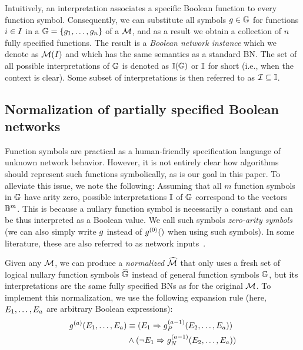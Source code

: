 Intuitively, an interpretation associates a specific Boolean function to every function symbol. Consequently, we can substitute all symbols $g \in \mathbb{G}$ for functions $i \in I$ in a $\mathbb{G} = \{g_1, \ldots, g_n\}$ of a $\mathcal{M}$, and as a result we obtain a collection of $n$ fully specified functions. The result is a \emph{Boolean network instance} which we denote as $\mathcal{M}(I)$ and which has the same semantics as a standard BN. The set of all possible interpretations of $\mathbb{G}$ is denoted as $\mathbb{I}(\mathbb{G})$ or $\mathbb{I}$ for short (i.e., when the context is clear). Some subset of interpretations is then referred to as $\mathcal{I} \subseteq \mathbb{I}$. 

\subsection[Normalization of PSBN]{Normalization of partially specified Boolean networks}

Function symbols are practical as a human-friendly specification language of unknown network behavior. However, it is not entirely clear how algorithms should represent such functions symbolically, as is our goal in this paper. To alleviate this issue, we note the following: Assuming that all $m$ function symbols in $\mathbb{G}$ have arity zero, possible interpretations $\mathbb{I}$ of $\mathbb{G}$ correspond to the vectors $\mathbb{B}^{m}$. This is because a nullary function symbol is necessarily a constant and can be thus interpreted as a Boolean value. We call such symbols \emph{zero-arity symbols} (we can also simply write $g$ instead of $g^{(0)}()$ when using such symbols). In some literature, these are also referred to as network inputs~\cite{Kobayashi2011}. 

Given any $\mathcal{M}$, we can produce a \emph{normalized} $\widehat{\mathcal{M}}$ that only uses a fresh set of logical nullary function symbols $\widehat{\mathbb{G}}$ instead of general function symbols $\mathbb{G}$, but its interpretations are the same fully specified BNs as for the original $\mathcal{M}$. To implement this normalization, we use the following expansion rule (here, $E_1, \ldots, E_a$ are arbitrary Boolean expressions):
\begin{align*}
	g^{(a)}(E_1, \ldots, E_a) &\equiv (E_1 \Rightarrow g^{(a-1)}_P(E_2, \ldots, E_a)) \\
    &\land (\neg E_1 \Rightarrow g^{(a-1)}_N(E_2, \ldots, E_a))
\end{align*}

